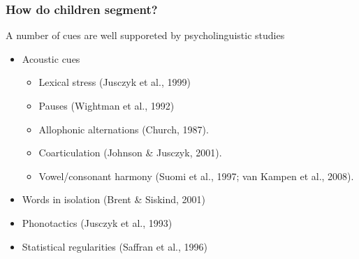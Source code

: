 \begin{frame}
\frametitle{How do children segment?}
A number of cues are well supporeted by psycholinguistic studies
\begin{itemize}
\item Acoustic cues
\begin{itemize}
    \item Lexical stress (Jusczyk et al., 1999)
    \item Pauses (Wightman et al., 1992)
    \item Allophonic alternations (Church, 1987).
    \item Coarticulation (Johnson \& Jusczyk, 2001).
    \item Vowel/consonant harmony (Suomi et al., 1997; van Kampen et al., 2008).
\end{itemize}
\item Words in isolation (Brent \& Siskind, 2001)
\item Phonotactics (Jusczyk et al., 1993)
\item Statistical regularities (Saffran et al., 1996)
\end{itemize}
\end{frame}
